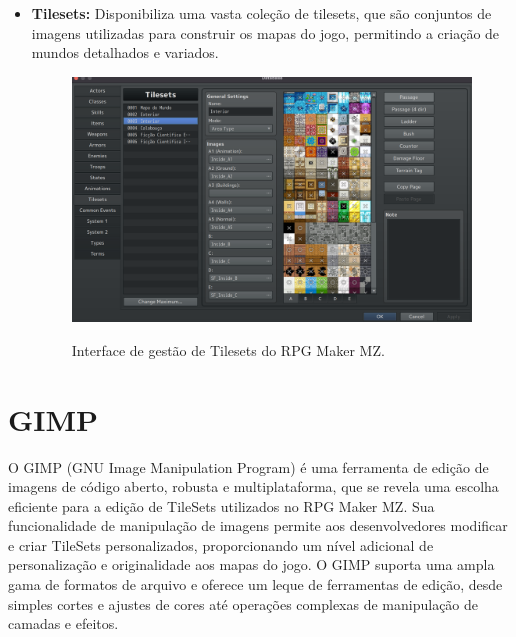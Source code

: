 \begin{itemize}
	      \newpage

	\item \textbf{Tilesets:} Disponibiliza uma vasta coleção de tilesets, que são conjuntos de imagens utilizadas para construir os mapas do jogo, permitindo a criação de mundos detalhados e variados.

	      \begin{figure}[ht]
		      \centering
		      \caption{Interface de gestão de Tilesets do RPG Maker MZ.}
		      \includegraphics[scale=0.3]{Textuais/Pictures/Tileset.png}
		      \label{fig:rpgmaker-interface-tilesets}
	      \end{figure}

\end{itemize}

\section{GIMP}

O GIMP (GNU Image Manipulation Program) é uma ferramenta de edição de imagens de código aberto, robusta e multiplataforma, que se revela uma escolha eficiente para a edição de TileSets utilizados no RPG Maker MZ. Sua funcionalidade de manipulação de imagens permite aos desenvolvedores modificar e criar TileSets personalizados, proporcionando um nível adicional de personalização e originalidade aos mapas do jogo. O GIMP suporta uma ampla gama de formatos de arquivo e oferece um leque de ferramentas de edição, desde simples cortes e ajustes de cores até operações complexas de manipulação de camadas e efeitos. \cite{GIMP_Documentation}

